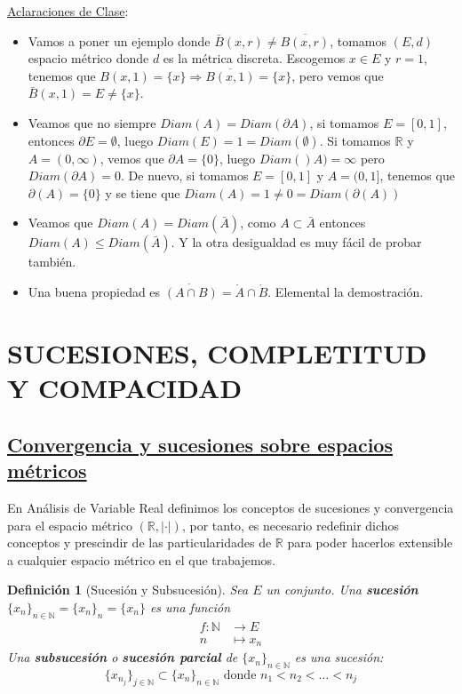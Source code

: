 \documentclass[10pt,a4paper,openright]{book}
\theoremstyle{break}
\newtheorem*{defi}{Definición}
\begin{document}
\underline{Aclaraciones de Clase}:
\begin{itemize}
\item Vamos a poner un ejemplo donde $\bar{B}(x,r)\neq \overline{B(x,r)}$, tomamos $(E,d)$ espacio métrico donde $d$ es la métrica discreta. Escogemos $x\in E$ y $r=1$, tenemos que $B(x,1)=\{x\}\Rightarrow \overline{B(x,1)} = \{x\}$, pero vemos que $\bar{B}(x,1) = E \neq \{x\}$.

\item Veamos que no siempre $Diam(A) = Diam (\partial A)$, si tomamos $E=[0,1]$, entonces $\partial E = \emptyset$, luego $Diam (E) =1 = Diam(\emptyset)$. Si tomamos $\mathbb{R}$ y $A=(0,\infty)$, vemos que $\partial A =\{0\}$, luego $Diam()A) = \infty$ pero $Diam (\partial A) = 0$. De nuevo, si tomamos $E=[0,1]$ y $A=(0,1]$, tenemos que $\partial(A) = \{0\}$ y se tiene que $Diam(A) = 1 \neq 0 = Diam (\partial(A))$

\item Veamos que $Diam(A) = Diam (\bar{A})$, como $A\subset \bar{A}$ entonces $Diam(A) \leq Diam (\bar{A})$. Y la otra desigualdad es muy fácil de probar también.

\item Una buena propiedad es $\mathring{(A\cap B)} = \mathring{A} \cap \mathring{B}$. Elemental la demostración.
\end{itemize}

\section*{SUCESIONES, COMPLETITUD Y COMPACIDAD}
\subsection*{\underline{Convergencia y sucesiones sobre espacios métricos}}
En Análisis de Variable Real definimos los conceptos de sucesiones y convergencia para el espacio métrico $(\mathbb{R}, |\cdot|)$, por tanto, es necesario redefinir dichos conceptos y prescindir de las particularidades de $\mathbb{R}$ para poder hacerlos extensible a cualquier espacio métrico en el que trabajemos.

\begin{defi}[Sucesión y Subsucesión]
Sea $E$ un conjunto. Una \textbf{sucesión} $\{x_n\}_{n \in \mathbb{N}} = \{x_n\}_n = \{x_n\}$ es una función 
\begin{align*}
f : \mathbb{N} &\to E \\ n &\mapsto x_n
\end{align*}
Una \textbf{subsucesión} o \textbf{sucesión parcial} de $\{x_n\}_{n \in \mathbb{N}}$ es una sucesión:
$$\{x_{n_j}\}_{j \in \mathbb{N}} \subset \{x_n\}_{n \in \mathbb{N}} \mbox{ donde } n_1 < n_2 < \ldots < n_j$$
\end{defi}
\end{document}
